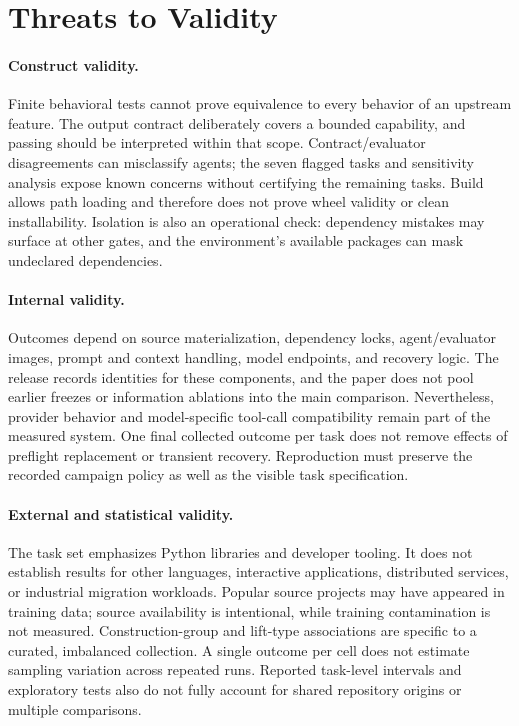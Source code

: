 \documentclass[acmsmall,screen,review,anonymous]{acmart}
\begin{document}
\section{Threats to Validity}
\label{sec:threats}

\paragraph{Construct validity.}
Finite behavioral tests cannot prove equivalence to every behavior of an upstream
feature. The output contract deliberately covers a bounded capability, and
passing should be interpreted within that scope. Contract/evaluator disagreements
can misclassify agents; the seven flagged tasks and sensitivity analysis expose
known concerns without certifying the remaining tasks. Build allows path loading
and therefore does not prove wheel validity or clean installability. Isolation
is also an operational check: dependency mistakes may surface at other gates,
and the environment's available packages can mask undeclared dependencies.

\paragraph{Internal validity.}
Outcomes depend on source materialization, dependency locks, agent/evaluator
images, prompt and context handling, model endpoints, and recovery logic.
The release records identities for these components, and the paper does not pool
earlier freezes or information ablations into the main comparison. Nevertheless,
provider behavior and model-specific tool-call compatibility remain part of the
measured system. One final collected outcome per task does not remove effects
of preflight replacement or transient recovery. Reproduction must preserve the
recorded campaign policy as well as the visible task specification.

\paragraph{External and statistical validity.}
The task set emphasizes Python libraries and developer tooling. It does not
establish results for other languages, interactive applications, distributed
services, or industrial migration workloads. Popular source projects may have
appeared in training data; source availability is intentional, while training
contamination is not measured. Construction-group and lift-type associations
are specific to a curated, imbalanced collection. A single outcome per cell
does not estimate sampling variation across repeated runs. Reported task-level
intervals and exploratory tests also do not fully account for shared repository
origins or multiple comparisons.
\end{document}
